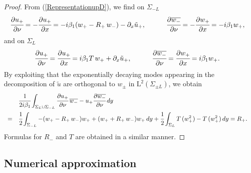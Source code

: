 \documentclass[11pt,a4paper]{report}
\newcommand{\dsp}{\displaystyle}
\newcommand{\mrm}[1]{\mathrm{#1}}
\newcommand{\mL}{\mrm{L}}
\begin{document}
\begin{proof}
From (\ref{RepresentationupD}), we find on $\Sigma_{-L}$
\[
\cfrac{\partial u_+}{\partial \nu}=-\cfrac{\partial u_+}{\partial x}= -i\beta_1 (w_+-R_+\,w_-)-\partial_x\tilde{u}_+,\qquad\quad \cfrac{\partial \overline{w_-}}{\partial \nu}=-\cfrac{\partial w_+}{\partial x}= -i\beta_1 w_+,
\]
and on $\Sigma_{L}$ 
\[
\cfrac{\partial u_+}{\partial \nu}=\cfrac{\partial u_+}{\partial x}= i\beta_1 T \,w_++\partial_x\tilde{u}_+,\qquad\quad \cfrac{\partial \overline{w_-}}{\partial \nu}=\cfrac{\partial w_+}{\partial x}= i\beta_1 w_+.
\]
By exploiting that the exponentially decaying modes appearing in the decomposition of $\tilde{u}$ are orthogonal to $w_\pm$ in $\mL^2(\Sigma_{\pm L})$, we obtain
\[
\begin{array}{ll}
&\dsp\cfrac{1}{2i\beta_1}\dsp\dsp\int_{\Sigma_{L}\cup\Sigma_{-L}}\cfrac{\partial u_+}{\partial \nu}\,\overline{w_-}-u_+\cfrac{\partial \overline{w_-}}{\partial \nu}\,dy \\[10pt]
=&\dsp\cfrac{1}{2}\dsp\dsp\int_{\Sigma_{-L}}- (w_+-R_+\,w_-)w_++(w_++R_+\,w_-) w_+\,dy+\cfrac{1}{2}\dsp\dsp\int_{\Sigma_{L}} T\,(w_+^2)- T\,(w_+^2)\,dy=R_+.
\end{array}
\]
Formulas for $R_-$ and $T$ are obtained in a similar manner. 
\end{proof} 
 


\subsection{Numerical approximation}\label{ParaNumApprox}
\end{document}
